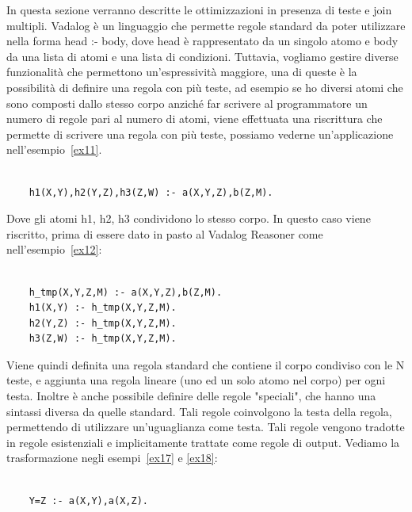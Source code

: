 In questa sezione verranno descritte le ottimizzazioni in presenza di teste e join multipli. \newline
Vadalog è un linguaggio che permette regole standard da poter utilizzare nella forma head :- body, dove head è rappresentato da un singolo atomo e body da una lista di atomi e una lista di condizioni. \newline
Tuttavia, vogliamo gestire diverse funzionalità che permettono un'espressività maggiore, una di queste è la possibilità di definire una regola con più teste, ad esempio se ho diversi atomi che sono composti dallo stesso corpo anziché far scrivere al programmatore un numero di regole pari al numero di atomi, viene effettuata una riscrittura che permette di scrivere una regola con più teste, possiamo vederne un'applicazione nell'esempio~\ref{ex11}. 
\begin{example}\label{ex11}
	\normalfont
	\begin{lstlisting}
	
	h1(X,Y),h2(Y,Z),h3(Z,W) :- a(X,Y,Z),b(Z,M).
	\end{lstlisting}
\end{example}
Dove gli atomi h1, h2, h3 condividono lo stesso corpo. \newline
In questo caso viene riscritto, prima di essere dato in pasto al Vadalog Reasoner come nell'esempio~\ref{ex12}: 
\begin{example}\label{ex12}
	\normalfont
	\begin{lstlisting}
	
	h_tmp(X,Y,Z,M) :- a(X,Y,Z),b(Z,M). 
	h1(X,Y) :- h_tmp(X,Y,Z,M). 
	h2(Y,Z) :- h_tmp(X,Y,Z,M). 
	h3(Z,W) :- h_tmp(X,Y,Z,M). 
	\end{lstlisting}
\end{example}
Viene quindi definita una regola standard che contiene il corpo condiviso con le N teste, e aggiunta una regola lineare (uno ed un solo atomo nel corpo) per ogni testa. \newline
Inoltre è anche possibile definire delle regole "speciali", che hanno una sintassi diversa da quelle standard. Tali regole coinvolgono la testa della regola, permettendo di utilizzare un'uguaglianza come testa. \newline
Tali regole vengono tradotte in regole esistenziali e implicitamente trattate come regole di output. Vediamo la trasformazione negli esempi~\ref{ex17} e \ref{ex18}:
\begin{example}\label{ex17}
	\normalfont
	\begin{lstlisting}
	
	Y=Z :- a(X,Y),a(X,Z).
	\end{lstlisting}
\end{example}
